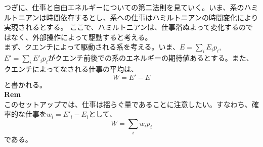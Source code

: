 \documentclass[a4paper,11pt]{jsarticle}
\numberwithin{equation}{section}
\begin{document}
つぎに、仕事と自由エネルギーについての第二法則を見ていく。いま、系のハミルトニアンは時間依存するとし、系への仕事はハミルトニアンの時間変化により実現されるとする。
ここで、ハミルトニアンは、仕事浴ぬよって変化するのではなく、外部操作によって駆動すると考える。\\
まず、クエンチによって駆動される系を考える。いま、$E =\sum_{i}E_i p_i$, $E' = \sum_{i}E'_i p_i$がクエンチ前後での系のエネルギーの期待値あるとする。また、クエンチによってなされる仕事の平均は、
\begin{equation}
    W = E'-E
\end{equation}
と書かれる。\\
\textbf{Rem}\\
このセットアップでは、仕事は揺らぐ量であることに注意したい。すなわち、確率的な仕事を$w_i = E'_i - E_i$として、
\begin{equation}
    W = \sum_{i}w_i p_i
\end{equation}
である。\\
\end{document}
